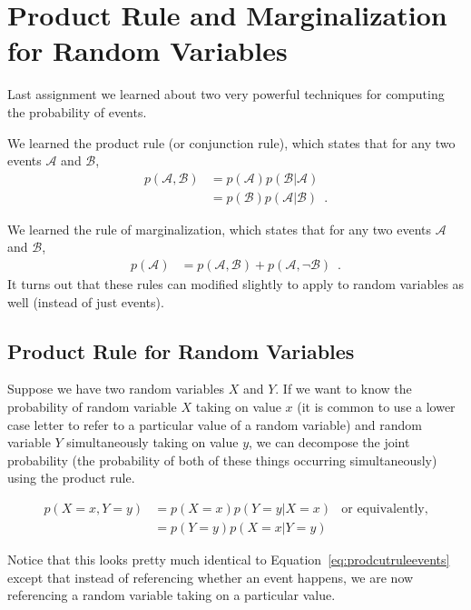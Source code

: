 \documentclass[assignment02_Solutions]{subfiles}
\begin{document}
\section{Product Rule and Marginalization for Random Variables}
\begin{recall}
Last assignment we learned about two very powerful techniques for computing the probability of events.
\bi
\item We learned the product rule (or conjunction rule), which states that for any two events $\mathcal{A}$ and $\mathcal{B}$,
\begin{align}
p(\mathcal{A}, \mathcal{B}) &= p(\mathcal{A}) p(\mathcal{B}|\mathcal{A}) \label{eq:prodcutruleevents} \\
&= p(\mathcal{B}) p(\mathcal{A}|\mathcal{B}) \enspace  . \nonumber
\end{align}
\item We learned the rule of marginalization, which states that for any two events $\mathcal{A}$ and $\mathcal{B}$,
\begin{align}
p(\mathcal{A}) &= p(\mathcal{A}, \mathcal{B}) + p(\mathcal{A}, \neg \mathcal{B}) \label{eq:marginalizationevents} \enspace .
\end{align}
\ei
It turns out that these rules can modified slightly to apply to random variables as well (instead of just events).
\end{recall}


\subsection{Product Rule for Random Variables}
Suppose we have two random variables $X$ and $Y$.  If we want to know the probability of random variable $X$ taking on value $x$ (it is common to use a lower case letter to refer to a particular value of a random variable) and random variable $Y$ simultaneously taking on value $y$, we can decompose the joint probability (the probability of both of these things occurring simultaneously) using the product rule.

\begin{align}
p(X = x, Y = y) &= p(X=x)p(Y=y | X=x) & \mbox{or equivalently,}\\
&= p(Y=y)p(X=x|Y=y) \nonumber
\end{align}

Notice that this looks pretty much identical to Equation~\ref{eq:prodcutruleevents} except that instead of referencing whether an event happens, we are now referencing a random variable taking on a particular value.
\end{document}
